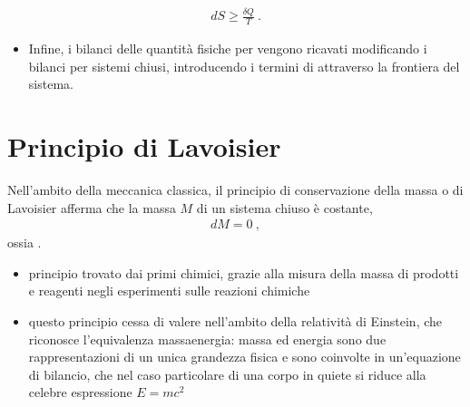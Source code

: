 \documentclass[letterpaper,10pt,italian]{jupyterBook}
\begin{document}
\begin{equation*}
\begin{split}d S \ge \frac{\delta Q}{T} \ .\end{split}
\end{equation*}\begin{itemize}
\item {} 
\sphinxAtStartPar
Infine, i bilanci delle quantità fisiche per {\hyperref[\detokenize{ch/thermodynamics/principles-open:physics-hs-thermodynamics-foundation-principles-open}]{}} vengono ricavati modificando i bilanci per sistemi chiusi, introducendo i termini di  attraverso la frontiera del sistema.

\end{itemize}



\sphinxstepscope


\section{Principio di Lavoisier}
\label{\detokenize{ch/thermodynamics/principles-lavoisier:principio-di-lavoisier}}\label{\detokenize{ch/thermodynamics/principles-lavoisier:physics-hs-thermodynamics-foundation-principles-lavoisier}}\label{\detokenize{ch/thermodynamics/principles-lavoisier::doc}}
\sphinxAtStartPar
Nell’ambito della meccanica classica, il principio di conservazione della massa \sphinxhyphen{} o di Lavoisier \sphinxhyphen{} afferma che la massa \(M\) di un sistema chiuso è costante,
\begin{equation*}
\begin{split}d M = 0 \ ,\end{split}
\end{equation*}
\sphinxAtStartPar
ossia .
\begin{itemize}
\item {} 
\sphinxAtStartPar
principio trovato dai primi chimici, grazie alla misura della massa di prodotti e reagenti negli esperimenti sulle reazioni chimiche

\item {} 
\sphinxAtStartPar
questo principio cessa di valere nell’ambito della relatività di Einstein, che riconosce l’equivalenza massa\sphinxhyphen{}energia: massa ed energia sono due rappresentazioni di un unica grandezza fisica e sono coinvolte in un’equazione di bilancio, che nel caso particolare di una corpo in quiete si riduce alla celebre espressione \(E = m c^2\)

\end{itemize}
\end{document}
